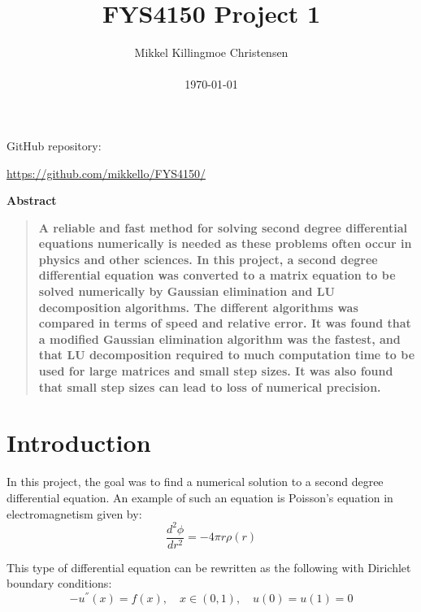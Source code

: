\documentclass[12pt]{article}
\title{FYS4150 Project 1}
\author
{Mikkel Killingmoe Christensen\\
\\
\normalsize{\today}
}
\date{}
\newenvironment{sciabstract}{%
\begin{quote} \bf}
{\end{quote}}
\begin{document}
 


\baselineskip24pt


\maketitle 



\begin{center}
\par GitHub repository:
\par \url{https://github.com/mikkello/FYS4150/}
\end{center}
\begin{center}
{\large \textbf{Abstract}}
\end{center}
\begin{sciabstract}
A reliable and fast method for solving second degree differential equations numerically is needed as these problems often occur in physics and other sciences. In this project, a second degree differential equation was converted to a matrix equation to be solved numerically by Gaussian elimination and LU decomposition algorithms. The different algorithms was compared in terms of speed and relative error. It was found that a modified Gaussian elimination algorithm was the fastest, and that LU decomposition required to much computation time to be used for large matrices and small step sizes. It was also found that small step sizes can lead to loss of numerical precision.   
\end{sciabstract}



\section{Introduction}
In this project, the goal was to find a numerical solution to a second degree differential equation. An example of such an equation is Poisson's equation in electromagnetism given by:
\begin{equation}
\frac{d^{2} \phi}{dr^{2}}=-4 \pi r\rho (r)
\end{equation}

This type of differential equation can be rewritten as the following with Dirichlet boundary conditions:
\begin{equation}
-u^{''}(x)=f(x), \quad x\in(0,1), \quad u(0)=u(1)=0
\end{equation}
\end{document}
